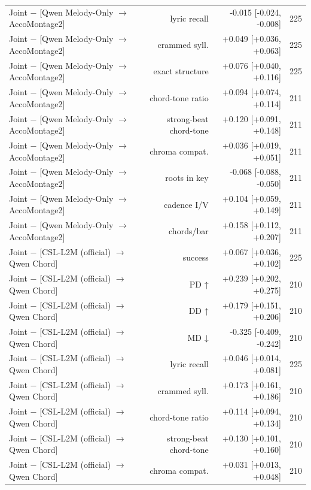 \begin{table}[t]
\begin{tabular}{lrrr}
Joint $-$ [Qwen Melody-Only $\rightarrow$ AccoMontage2] & lyric recall & -0.015 [-0.024, -0.008] & 225 \\
Joint $-$ [Qwen Melody-Only $\rightarrow$ AccoMontage2] & crammed syll. & +0.049 [+0.036, +0.063] & 225 \\
Joint $-$ [Qwen Melody-Only $\rightarrow$ AccoMontage2] & exact structure & +0.076 [+0.040, +0.116] & 225 \\
Joint $-$ [Qwen Melody-Only $\rightarrow$ AccoMontage2] & chord-tone ratio & +0.094 [+0.074, +0.114] & 211 \\
Joint $-$ [Qwen Melody-Only $\rightarrow$ AccoMontage2] & strong-beat chord-tone & +0.120 [+0.091, +0.148] & 211 \\
Joint $-$ [Qwen Melody-Only $\rightarrow$ AccoMontage2] & chroma compat. & +0.036 [+0.019, +0.051] & 211 \\
Joint $-$ [Qwen Melody-Only $\rightarrow$ AccoMontage2] & roots in key & -0.068 [-0.088, -0.050] & 211 \\
Joint $-$ [Qwen Melody-Only $\rightarrow$ AccoMontage2] & cadence I/V & +0.104 [+0.059, +0.149] & 211 \\
Joint $-$ [Qwen Melody-Only $\rightarrow$ AccoMontage2] & chords/bar & +0.158 [+0.112, +0.207] & 211 \\
Joint $-$ [CSL-L2M (official) $\rightarrow$ Qwen Chord] & success & +0.067 [+0.036, +0.102] & 225 \\
Joint $-$ [CSL-L2M (official) $\rightarrow$ Qwen Chord] & PD ↑ & +0.239 [+0.202, +0.275] & 210 \\
Joint $-$ [CSL-L2M (official) $\rightarrow$ Qwen Chord] & DD ↑ & +0.179 [+0.151, +0.206] & 210 \\
Joint $-$ [CSL-L2M (official) $\rightarrow$ Qwen Chord] & MD ↓ & -0.325 [-0.409, -0.242] & 210 \\
Joint $-$ [CSL-L2M (official) $\rightarrow$ Qwen Chord] & lyric recall & +0.046 [+0.014, +0.081] & 225 \\
Joint $-$ [CSL-L2M (official) $\rightarrow$ Qwen Chord] & crammed syll. & +0.173 [+0.161, +0.186] & 210 \\
Joint $-$ [CSL-L2M (official) $\rightarrow$ Qwen Chord] & chord-tone ratio & +0.114 [+0.094, +0.134] & 210 \\
Joint $-$ [CSL-L2M (official) $\rightarrow$ Qwen Chord] & strong-beat chord-tone & +0.130 [+0.101, +0.160] & 210 \\
Joint $-$ [CSL-L2M (official) $\rightarrow$ Qwen Chord] & chroma compat. & +0.031 [+0.013, +0.048] & 210 \\

\end{tabular}
\end{table}
